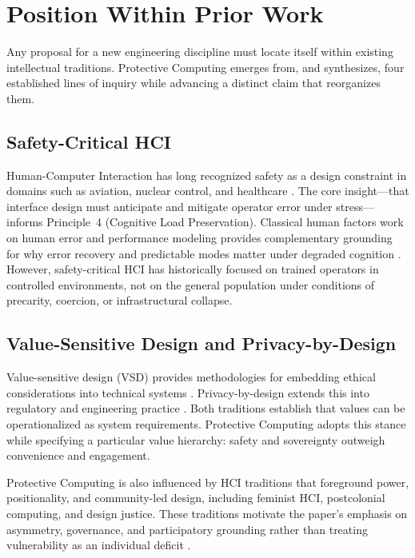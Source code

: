 \documentclass[12pt]{article}
\begin{document}
\section{Position Within Prior Work}

Any proposal for a new engineering discipline must locate itself within existing intellectual traditions. Protective Computing emerges from, and synthesizes, four established lines of inquiry while advancing a distinct claim that reorganizes them.

\subsection{Safety-Critical HCI}
Human-Computer Interaction has long recognized safety as a design constraint in domains such as aviation, nuclear control, and healthcare \cite{bainbridge1983ironies}. The core insight---that interface design must anticipate and mitigate operator error under stress---informs Principle~4 (Cognitive Load Preservation). Classical human factors work on human error and performance modeling provides complementary grounding for why error recovery and predictable modes matter under degraded cognition \cite{reason1990humanerror,rasmussen1983skills}. However, safety-critical HCI has historically focused on trained operators in controlled environments, not on the general population under conditions of precarity, coercion, or infrastructural collapse.

\subsection{Value-Sensitive Design and Privacy-by-Design}
Value-sensitive design (VSD) provides methodologies for embedding ethical considerations into technical systems \cite{friedman2002vsd}. Privacy-by-design extends this into regulatory and engineering practice \cite{cavoukian2009pbd}. Both traditions establish that values can be operationalized as system requirements. Protective Computing adopts this stance while specifying a particular value hierarchy: safety and sovereignty outweigh convenience and engagement.

Protective Computing is also influenced by HCI traditions that foreground power, positionality, and community-led design, including feminist HCI, postcolonial computing, and design justice. These traditions motivate the paper's emphasis on asymmetry, governance, and participatory grounding rather than treating vulnerability as an individual deficit \cite{bardzell2010feministhci,irani2010postcolonial,costanzaChock2020designJustice,apc2016fpi}.
\end{document}
